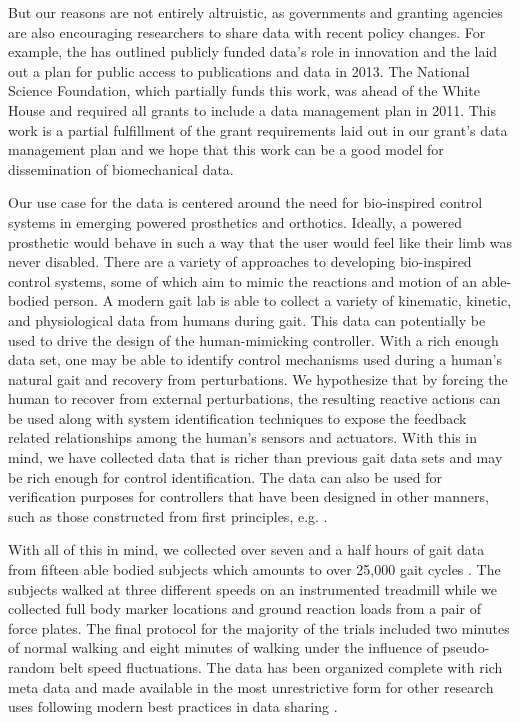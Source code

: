 \documentclass[fleqn,12pt]{wlpeerj}
\begin{document}
But our reasons are not entirely altruistic, as governments and granting
agencies are also encouraging researchers to share data with recent policy
changes. For example, the \cite{EuropeanCommission2012} has outlined publicly
funded data's role in innovation and the \cite{WhiteHouse2013} laid out a plan
for public access to publications and data in 2013. The National Science
Foundation, which partially funds this work, was ahead of the White House and
required all grants to include a data management plan in 2011. This work is a
partial fulfillment of the grant requirements laid out in our grant's data
management plan and we hope that this work can be a good model for
dissemination of biomechanical data.

Our use case for the data is centered around the need for bio-inspired control
systems in emerging powered prosthetics and orthotics. Ideally, a powered
prosthetic would behave in such a way that the user would feel like their limb
was never disabled. There are a variety of approaches to developing
bio-inspired control systems, some of which aim to mimic the reactions and
motion of an able-bodied person. A modern gait lab is able to collect a variety
of kinematic, kinetic, and physiological data from humans during gait. This
data can potentially be used to drive the design of the human-mimicking
controller. With a rich enough data set, one may be able to identify control
mechanisms used during a human's natural gait and recovery from perturbations.
We hypothesize that by forcing the human to recover from external
perturbations, the resulting reactive actions can be used along with system
identification techniques to expose the feedback related relationships among
the human's sensors and actuators. With this in mind, we have collected data
that is richer than previous gait data sets and may be rich enough for control
identification. The data can also be used for verification purposes for
controllers that have been designed in other manners, such as those constructed
from first principles, e.g. \citep{Geyer2010}.

With all of this in mind, we collected over seven and a half hours of gait data
from fifteen able bodied subjects which amounts to over 25,000 gait cycles
\citep{Moore2014}. The subjects walked at three different speeds on an
instrumented treadmill while we collected full body marker locations and ground
reaction loads from a pair of force plates. The final protocol for the majority
of the trials included two minutes of normal walking and eight minutes of
walking under the influence of pseudo-random belt speed fluctuations. The data
has been organized complete with rich meta data and made available in the most
unrestrictive form for other research uses following modern best practices in
data sharing \citep{White2013}.
\end{document}
